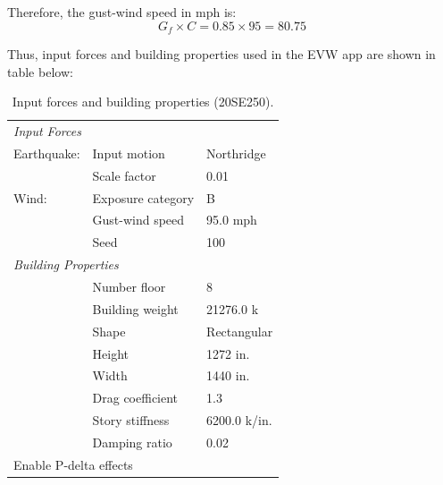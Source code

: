 \documentclass{simcenterdocumentation}
\begin{document}
Therefore, the gust-wind speed in mph is:
\begin{equation*}
G_f \times C = 0.85 \times 95 = \boxed{80.75}
\end{equation*}

Thus, input forces and building properties used in the EVW app are shown in table below:

\begin{table}[H]
	\centering \caption{Input forces and building properties (20SE250).}
	\begin{tabular}{lll}
	\toprule
	\multicolumn{3}{l}{\textit{Input Forces}}					\\
	\cmidrule(rl){1-3}
	Earthquake:		& Input motion		& Northridge			\\
					& Scale factor		& 0.01					\\
	Wind:			& Exposure category	& B						\\
					& Gust-wind speed	& 95.0 mph				\\
					& Seed				& 100					\\
	\midrule
	\multicolumn{3}{l}{\textit{Building Properties}}			\\
	\cmidrule(rl){1-3}
					& Number floor		& 8						\\
					& Building weight	& 21276.0 k				\\
					& Shape				& Rectangular			\\
					& Height			& 1272 in.				\\
					& Width				& 1440 in.				\\
					& Drag coefficient	& 1.3					\\
					& Story stiffness	& 6200.0 k/in.			\\
					& Damping ratio		& 0.02					\\
	\midrule
	\multicolumn{3}{l}{Enable P-delta effects}					\\
	\bottomrule
	\end{tabular}
\end{table}
\end{document}
